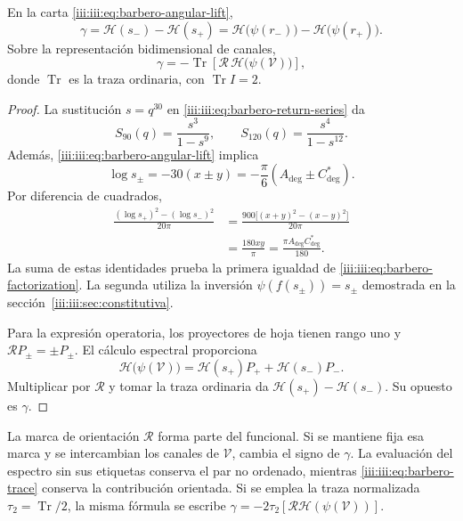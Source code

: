 \begin{theorem}
\label{iii:iii:thm:barbero-factorization}
En la carta \eqref{iii:iii:eq:barbero-angular-lift},
\begin{equation}
 \gamma=\mathcal H(s_-)-\mathcal H(s_+)
       =\mathcal H\bigl(\psi(r_-)\bigr)
        -\mathcal H\bigl(\psi(r_+)\bigr).
 \label{iii:iii:eq:barbero-factorization}
\end{equation}
Sobre la representación bidimensional de canales,
\begin{equation}
 \gamma=-\operatorname{Tr}
    \left[\mathcal R\,\mathcal H\bigl(\psi(\mathcal V)\bigr)\right],
 \label{iii:iii:eq:barbero-trace}
\end{equation}
donde $\operatorname{Tr}$ es la traza ordinaria, con
$\operatorname{Tr}I=2$.
\end{theorem}
\begin{proof}
La sustitución $s=q^{30}$ en \eqref{iii:iii:eq:barbero-return-series} da
\[
 S_{90}(q)=\frac{s^3}{1-s^9},\qquad
 S_{120}(q)=\frac{s^4}{1-s^{12}}.
\]
Además, \eqref{iii:iii:eq:barbero-angular-lift} implica
\[
 \log s_\pm=-30(x\pm y)
 =-\frac\pi6(A_{\deg}\pm C^*_{\deg}).
\]
Por diferencia de cuadrados,
\begin{align}
 \frac{(\log s_+)^2-(\log s_-)^2}{20\pi}
 &=\frac{900\bigl[(x+y)^2-(x-y)^2\bigr]}{20\pi}\\
 &=\frac{180xy}{\pi}
 =\frac{\pi A_{\deg}C^*_{\deg}}{180}.
 \label{iii:iii:eq:barbero-log-term}
\end{align}
La suma de estas identidades prueba la primera igualdad de
\eqref{iii:iii:eq:barbero-factorization}. La segunda utiliza la inversión
$\psi(f(s_\pm))=s_\pm$ demostrada en la
sección~\ref{iii:iii:sec:constitutiva}.

Para la expresión operatoria, los proyectores de hoja tienen rango uno y
$\mathcal RP_\pm=\pm P_\pm$. El cálculo espectral proporciona
\[
 \mathcal H\bigl(\psi(\mathcal V)\bigr)
 =\mathcal H(s_+)P_++\mathcal H(s_-)P_-.
\]
Multiplicar por $\mathcal R$ y tomar la traza ordinaria da
$\mathcal H(s_+)-\mathcal H(s_-)$. Su opuesto es $\gamma$.
\end{proof}

La marca de orientación $\mathcal R$ forma parte del funcional. Si se
mantiene fija esa marca y se intercambian los canales de $\mathcal V$,
cambia el signo de $\gamma$. La evaluación del espectro sin sus etiquetas conserva
el par no ordenado, mientras \eqref{iii:iii:eq:barbero-trace} conserva la
contribución orientada. Si se emplea la traza normalizada
$\tau_2=\operatorname{Tr}/2$, la misma fórmula se escribe
$\gamma=-2\tau_2[\mathcal R\mathcal H(\psi(\mathcal V))]$.

